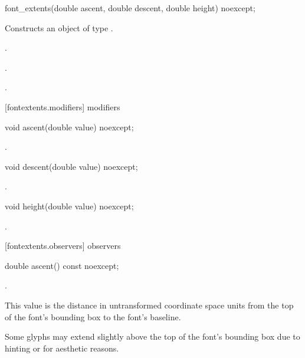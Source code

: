 \begin{itemdecl}
    font_extents(double ascent, double descent, double height) noexcept;
\end{itemdecl}
\begin{itemdescr}
	\pnum
	\effects
	Constructs an object of type .
	
	\pnum
	\postconditions
	.
	
	.
	
	.
\end{itemdescr}

 [fontextents.modifiers]{ modifiers}

\begin{itemdecl}
    void ascent(double value) noexcept;
\end{itemdecl}

\begin{itemdescr}
	\pnum
	\postconditions
	.
\end{itemdescr}

\begin{itemdecl}
    void descent(double value) noexcept;
\end{itemdecl}

\begin{itemdescr}
	\pnum
	\postconditions
	.
	
\end{itemdescr}

\begin{itemdecl}
    void height(double value) noexcept;
\end{itemdecl}

\begin{itemdescr}
	\pnum
	\postconditions
	.
	
\end{itemdescr}

 [fontextents.observers]{ observers}

\begin{itemdecl}
    double ascent() const noexcept;
\end{itemdecl}
\begin{itemdescr}
	\pnum
	\returns
	.
	
	\pnum
	\remarks
	This value is the distance in untransformed coordinate space units from the top of the font's bounding box to the font's baseline.
	
	\pnum
	Some glyphs may extend slightly above the top of the font's bounding box due to hinting or for aesthetic reasons.

\end{itemdescr}

